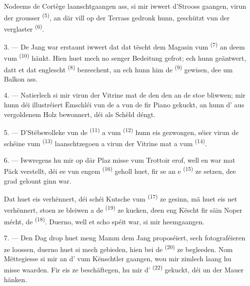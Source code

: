 Nodeems de Cortège laanschtgaangen ass, si mir iwwert d'Strooss gaangen, virun der
grousser  \textsuperscript{(5)}, an där vill 
op der Terrass  gedronk hunn, geschützt vun der verglaster
 \textsuperscript{(6)}.

3. --- De Jang war erstaunt iwwert dat  dat tëscht dem Magasin
vum  \textsuperscript{(7)} an deem vum
 \textsuperscript{(10)} hänkt. Hien huet mech no senger
Bedeitung gefrot; ech hunn geäntwert, datt et dat englescht 
\textsuperscript{(8)} bezeechent, an ech hunn him de 
\textsuperscript{(9)} gewisen, dee um Balkon ass.

\VUsaut{3.0mm}

4. --- Natierlech si mir virun der Vitrine mat de  den
 den  an de  stoe bliwwen; mir
hunn déi illustréiert Ëmschléi vun de  a vun de
 fir Piano gekuckt, an hunn d' aus
vergoldenem Holz bewonnert, déi als Schëld déngt.

5. --- D'Stëbswolleke vun de  \textsuperscript{(11)} a vum
 \textsuperscript{(12)} hunn eis gezwongen, séier virun de schéine
 vum  \textsuperscript{(13)}
laanschtzegoen a virun der Vitrine mat  a  vum
 \textsuperscript{(14)}.

6. --- Iwwregens hu mir op där Plaz misse vum Trottoir erof, well en war mat Päck
verstellt, déi ee vun engem  \textsuperscript{(16)} geholl huet,
fir se an e  \textsuperscript{(15)} ze setzen, dee grad gelount ginn
war.

Dat huet eis verhënnert, déi schéi Kutsche vum 
\textsuperscript{(17)} ze gesinn, mä huet eis net verhënnert, stoen ze bleiwen a de
 \textsuperscript{(19)} ze kucken, deen eng Këscht fir säin Noper
mécht, de  \textsuperscript{(18)}. Duerno, well et
scho spéit war, si mir heemgaangen.

\VUsaut{3.0mm}

7. --- Den Dag drop huet meng Mamm dem Jang proposéiert, sech fotograféieren ze
loossen, duerno huet si mech gebieden, hien bei de 
\textsuperscript{(20)} ze begleeden. Nom Mëttegiesse si mir an d' vum
Kënschtler gaangen, wou mir zimlech laang hu misse waarden. Fir eis ze beschäftegen,
hu mir d' \textsuperscript{(22)} gekuckt, déi un der Mauer hänken.

